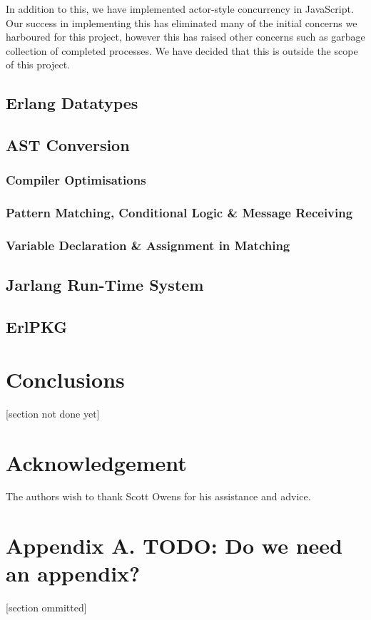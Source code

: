 \documentclass[twoside,12pt,titlepage,a4paper]{article}
\begin{document}
In addition to this, we have implemented actor-style concurrency in JavaScript. Our success in implementing this has eliminated many of the initial concerns we harboured for this project, however this has raised other concerns such as garbage collection of completed processes. We have decided that this is outside the scope of this project.

\subsection{Erlang Datatypes}
\subsection{AST Conversion}
\subsubsection{Compiler Optimisations}
\subsubsection{Pattern Matching, Conditional Logic \& Message Receiving}
\subsubsection{Variable Declaration \& Assignment in Matching}
\subsection{Jarlang Run-Time System}
\subsection{ErlPKG}

\section{Conclusions}
\label{Conclusions}

 [section not done yet]

\section{Acknowledgement}
The authors wish to thank Scott Owens for his assistance
and advice.

\appendix
\section*{Appendix A. TODO: Do we need an appendix?}


[section ommitted]



\vskip 0.2in


\end{document}
